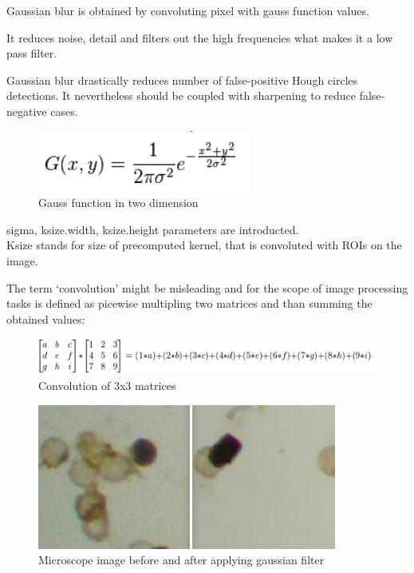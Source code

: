 \documentclass[12pt,twoside,a4paper]{article}
\begin{document}
Gaussian blur is obtained by convoluting pixel with gauss function values. 

It reduces noise, detail and filters out the high frequencies what makes it a low pass filter.\cite{cv}

Gaussian blur drastically reduces number of false-positive Hough circles detections. It nevertheless should be coupled with sharpening to reduce false-negative cases.\cite{cnoisy} 


\begin{figure}[H]
\centering
\includegraphics[width=0.4\paperwidth]{gauss}
\caption{Gauss function in two dimension\cite{featproc}}
\end{figure}


sigma, ksize.width, ksize.height  parameters are introducted.\\
Ksize stands for size of precomputed kernel, that is convoluted with ROIs on the image.

The term ‘convolution’ might be misleading and for the scope of image processing tasks is defined as picewise multipling two matrices and than summing the obtained values:

 
\begin{figure}[H]
\centering
\includegraphics[width=0.8\paperwidth]{conv}
\caption{Convolution of 3x3 matrices\cite{gimp}}
\end{figure}

 
\begin{figure}[H]
\centering
\includegraphics[width=0.4\paperwidth]{micro}
\caption{Microscope image before and after applying gaussian filter\cite{cnoisy}}
\end{figure}
\end{document}
